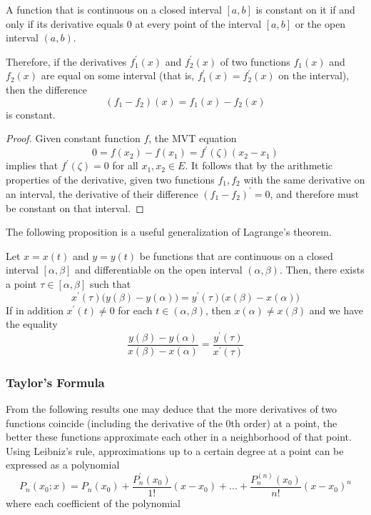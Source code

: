   \begin{corollary}
  A function that is continuous on a closed interval $[a,b]$ is constant on it if and only if its derivative equals $0$ at every point of the interval $[a,b]$ or the open interval $(a, b)$. 

  Therefore, if the derivatives $f_1^\prime (x)$ and $f_2^\prime (x)$ of two functions $f_1 (x)$ and $f_2 (x)$ are equal on some interval (that is, $f_1^\prime (x) = f_2^\prime (x)$ on the interval), then the difference
  \[(f_1 - f_2) (x) = f_1 (x) - f_2 (x)\]
  is constant. 
  \end{corollary}
  \begin{proof}
  Given constant function $f$, the MVT equation 
  \[0 = f(x_2) - f(x_1) = f^\prime (\zeta) (x_2 - x_1)\]
  implies that $f^\prime (\zeta) = 0$ for all $x_1, x_2 \in E$. It follows that by the arithmetic properties of the derivative, given two functions $f_1, f_2$ with the same derivative on an interval, the derivative of their difference $(f_1 - f_2)^\prime = 0$, and therefore must be constant on that interval. 
  \end{proof}

  The following proposition is a useful generalization of Lagrange's theorem. 
  \begin{theorem}
  Let $x = x(t)$ and $y = y(t)$ be functions that are continuous on a closed interval $[\alpha, \beta]$ and differentiable on the open interval $(\alpha, \beta)$. Then, there exists a point $\tau \in [\alpha, \beta]$ such that
  \[x^\prime (\tau) \big( y(\beta) - y (\alpha)\big) = y^\prime (\tau) \big( x(\beta) - x(\alpha)\big)\]
  If in addition $x^\prime (t) \neq 0$ for each $t \in (\alpha, \beta)$, then $x(\alpha) \neq x(\beta)$ and we have the equality 
  \[\frac{y(\beta) - y(\alpha)}{x(\beta) - x(\alpha)} = \frac{y^\prime (\tau)}{x^\prime (\tau)}\]
  \end{theorem}

  \subsubsection{Taylor's Formula}
  From the following results one may deduce that the more derivatives of two functions coincide (including the derivative of the $0$th order) at a point, the better these functions approximate each other in a neighborhood of that point. Using Leibniz's rule, approximations up to a certain degree at a point can be expressed as a polynomial 
  \[P_n (x_0; x) = P_n (x_0) + \frac{P_n^\prime (x_0)}{1!} (x-x_0) + ... + \frac{P_n^{(n)} (x_0)}{n!} (x-x_0)^n\]
  where each coefficient of the polynomial 

